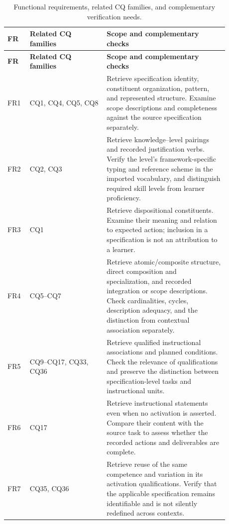 \begingroup
\small
\begin{longtable}{
    p{0.08\linewidth}
    p{0.31\linewidth}
    p{0.49\linewidth}
}
\caption{Functional requirements, related CQ families, and complementary verification needs.}
\label{tab:traceability-fr-cq} \\
\toprule
\textbf{FR} & \textbf{Related CQ families} & \textbf{Scope and complementary checks} \\
\midrule
\endfirsthead

\toprule
\textbf{FR} & \textbf{Related CQ families} & \textbf{Scope and complementary checks} \\
\midrule
\endhead

\bottomrule
\endfoot

FR1 & CQ1, CQ4, CQ5, CQ8 &
Retrieve specification identity, constituent organization, pattern, and
represented structure. Examine scope descriptions and completeness
against the source specification separately. \\

FR2 & CQ2, CQ3 &
Retrieve knowledge--level pairings and recorded justification verbs.
Verify the level's framework-specific typing and reference scheme in
the imported vocabulary, and distinguish required skill levels from
learner proficiency. \\

FR3 & CQ1 &
Retrieve dispositional constituents. Examine their meaning and relation
to expected action; inclusion in a specification is not an attribution
to a learner. \\

FR4 & CQ5--CQ7 &
Retrieve atomic/composite structure, direct composition and specialization,
and recorded integration or scope descriptions. Check cardinalities,
cycles, description adequacy, and the distinction from contextual
association separately. \\

FR5 & CQ9--CQ17, CQ33, CQ36 &
Retrieve qualified instructional associations and planned conditions.
Check the relevance of qualifications and preserve the distinction
between specification-level tasks and instructional units. \\

FR6 & CQ17 &
Retrieve instructional statements even when no activation is asserted.
Compare their content with the source task to assess whether the
recorded actions and deliverables are complete. \\

FR7 & CQ35, CQ36 &
Retrieve reuse of the same competence and variation in its activation
qualifications. Verify that the applicable specification remains
identifiable and is not silently redefined across contexts. \\


\end{longtable}
